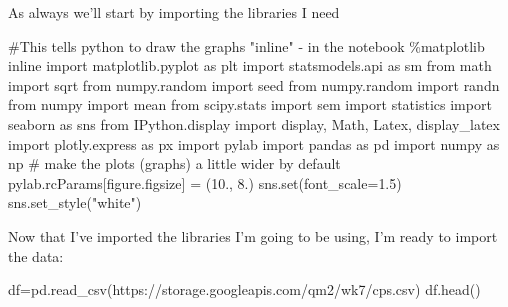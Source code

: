\documentclass[
  letterpaper,
  DIV=11,
  numbers=noendperiod]{scrreprt}
\newenvironment{Shaded}{\begin{snugshade}}{\end{snugshade}}
\newcommand{\BuiltInTok}[1]{\textcolor[rgb]{0.00,0.23,0.31}{#1}}
\newcommand{\CommentTok}[1]{\textcolor[rgb]{0.37,0.37,0.37}{#1}}
\newcommand{\FloatTok}[1]{\textcolor[rgb]{0.68,0.00,0.00}{#1}}
\newcommand{\ImportTok}[1]{\textcolor[rgb]{0.00,0.46,0.62}{#1}}
\newcommand{\NormalTok}[1]{\textcolor[rgb]{0.00,0.23,0.31}{#1}}
\newcommand{\OperatorTok}[1]{\textcolor[rgb]{0.37,0.37,0.37}{#1}}
\newcommand{\StringTok}[1]{\textcolor[rgb]{0.13,0.47,0.30}{#1}}
\begin{document}
As always we'll start by importing the libraries I need

\begin{Shaded}
\begin{Highlighting}[]
\CommentTok{\#This tells python to draw the graphs "inline" {-} in the notebook}
\OperatorTok{\%}\NormalTok{matplotlib inline  }
\ImportTok{import}\NormalTok{ matplotlib.pyplot }\ImportTok{as}\NormalTok{ plt}
\ImportTok{import}\NormalTok{ statsmodels.api }\ImportTok{as}\NormalTok{ sm}
\ImportTok{from}\NormalTok{ math }\ImportTok{import}\NormalTok{ sqrt}
\ImportTok{from}\NormalTok{ numpy.random }\ImportTok{import}\NormalTok{ seed}
\ImportTok{from}\NormalTok{ numpy.random }\ImportTok{import}\NormalTok{ randn}
\ImportTok{from}\NormalTok{ numpy }\ImportTok{import}\NormalTok{ mean}
\ImportTok{from}\NormalTok{ scipy.stats }\ImportTok{import}\NormalTok{ sem}
\ImportTok{import}\NormalTok{ statistics }
\ImportTok{import}\NormalTok{ seaborn }\ImportTok{as}\NormalTok{ sns}
\ImportTok{from}\NormalTok{ IPython.display }\ImportTok{import}\NormalTok{ display, Math, Latex, display\_latex}
\ImportTok{import}\NormalTok{ plotly.express }\ImportTok{as}\NormalTok{ px}
\ImportTok{import}\NormalTok{ pylab}
\ImportTok{import}\NormalTok{ pandas }\ImportTok{as}\NormalTok{ pd}
\ImportTok{import}\NormalTok{ numpy }\ImportTok{as}\NormalTok{ np}
\CommentTok{\# make the plots (graphs) a little wider by default}
\NormalTok{pylab.rcParams[}\StringTok{\textquotesingle{}figure.figsize\textquotesingle{}}\NormalTok{] }\OperatorTok{=}\NormalTok{ (}\FloatTok{10.}\NormalTok{, }\FloatTok{8.}\NormalTok{)}
\NormalTok{sns.}\BuiltInTok{set}\NormalTok{(font\_scale}\OperatorTok{=}\FloatTok{1.5}\NormalTok{)}
\NormalTok{sns.set\_style(}\StringTok{"white"}\NormalTok{)}

\end{Highlighting}
\end{Shaded}

Now that I've imported the libraries I'm going to be using, I'm ready to
import the data:

\begin{Shaded}
\begin{Highlighting}[]
\NormalTok{df}\OperatorTok{=}\NormalTok{pd.read\_csv(}\StringTok{\textquotesingle{}https://storage.googleapis.com/qm2/wk7/cps.csv\textquotesingle{}}\NormalTok{)}
\NormalTok{df.head()}
\end{Highlighting}
\end{Shaded}
\end{document}
